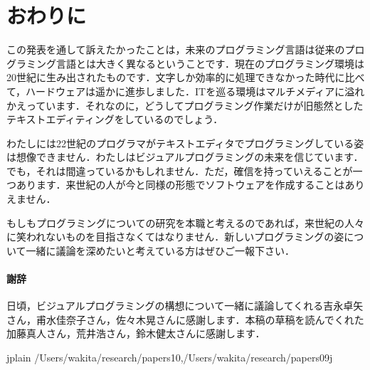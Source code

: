 \documentclass [11pt] {jsarticle}
\newcommand\Section[1]{\newpage \section {#1}}
\newcommand\raisedrule[2][0em]{\leaders\hbox{\rule[#1]{1pt}{#2}}\hfill}
\newcommand\HFill{\hspace {1zw}\raisedrule[1ex]{.5pt}\hspace {1zw}}
\begin{document}


\Section {おわりに}

この発表を通して訴えたかったことは，未来のプログラミング言語は従来のプログラミング言語とは大きく異なるということです．現在のプログラミング環境は20世紀に生み出されたものです．文字しか効率的に処理できなかった時代に比べて，ハードウェアは遥かに進歩しました．ITを巡る環境はマルチメディアに溢れかえっています．それなのに，どうしてプログラミング作業だけが旧態然としたテキストエディティングをしているのでしょう．

わたしには22世紀のプログラマがテキストエディタでプログラミングしている姿は想像できません．わたしはビジュアルプログラミングの未来を信じています．でも，それは間違っているかもしれません．ただ，確信を持っていえることが一つあります．来世紀の人が今と同様の形態でソフトウェアを作成することはありえません．

もしもプログラミングについての研究を本職と考えるのであれば，来世紀の人々に笑われないものを目指さなくてはなりません．新しいプログラミングの姿について一緒に議論を深めたいと考えている方はぜひご一報下さい．

\paragraph {謝辞} 日頃，ビジュアルプログラミングの構想について一緒に議論してくれる吉永卓矢さん，甫水佳奈子さん，佐々木晃さんに感謝します．本稿の草稿を読んでくれた加藤真人さん，荒井浩さん，鈴木健太さんに感謝します．

 {jplain}
 {/Users/wakita/research/papers10,/Users/wakita/research/papers09j}
\end{document}
